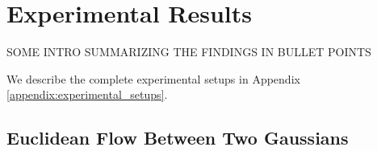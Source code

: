 
\chapter{Experimental Results}\label{chapter:results}

{\color{red} SOME INTRO SUMMARIZING THE FINDINGS IN BULLET POINTS}

We describe the complete experimental setups in Appendix \ref{appendix:experimental_setups}.

\section{Euclidean Flow Between Two Gaussians} \label{sec:gaussian_flow}

